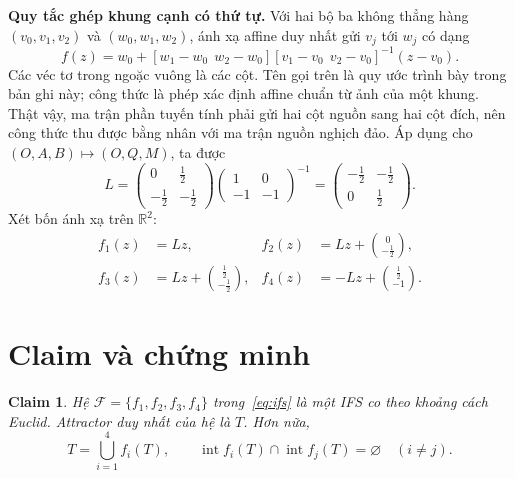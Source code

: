 \documentclass[12pt,a4paper]{article}
\newtheorem{claim}{Claim}
\begin{document}
\textbf{Quy tắc ghép khung cạnh có thứ tự.}
Với hai bộ ba không thẳng hàng $(v_0,v_1,v_2)$ và $(w_0,w_1,w_2)$, ánh xạ affine duy nhất gửi $v_j$ tới $w_j$ có dạng
\[
f(z)=w_0+[w_1-w_0\ \ w_2-w_0]
[v_1-v_0\ \ v_2-v_0]^{-1}(z-v_0).
\]
Các véc tơ trong ngoặc vuông là các cột. Tên gọi trên là quy ước trình bày trong bản ghi này; công thức là phép xác định affine chuẩn từ ảnh của một khung. Thật vậy, ma trận phần tuyến tính phải gửi hai cột nguồn sang hai cột đích, nên công thức thu được bằng nhân với ma trận nguồn nghịch đảo. Áp dụng cho $(O,A,B)\mapsto(O,Q,M)$, ta được
\[
L=\begin{pmatrix}0&\tfrac12\\-\tfrac12&-\tfrac12\end{pmatrix}
\begin{pmatrix}1&0\\-1&-1\end{pmatrix}^{-1}
=\begin{pmatrix}-\tfrac12&-\tfrac12\\0&\tfrac12\end{pmatrix}.
\]
Xét bốn ánh xạ trên $\mathbb R^2$:
\begin{equation}\label{eq:ifs}
\begin{aligned}
 f_1(z)&=Lz,& f_2(z)&=Lz+\binom{0}{-\tfrac12},\\
 f_3(z)&=Lz+\binom{\tfrac12}{-\tfrac12},&
 f_4(z)&=-Lz+\binom{\tfrac12}{-1}.
\end{aligned}
\end{equation}

\section{Claim và chứng minh}
\begin{claim}\label{cl:triangle}
Hệ $\mathcal F=\{f_1,f_2,f_3,f_4\}$ trong~\eqref{eq:ifs} là một IFS co theo khoảng cách Euclid. Attractor duy nhất của hệ là $T$. Hơn nữa,
\[
T=\bigcup_{i=1}^4 f_i(T),\qquad
\operatorname{int}f_i(T)\cap\operatorname{int}f_j(T)=\varnothing\quad(i\ne j).
\]
\end{claim}
\end{document}
